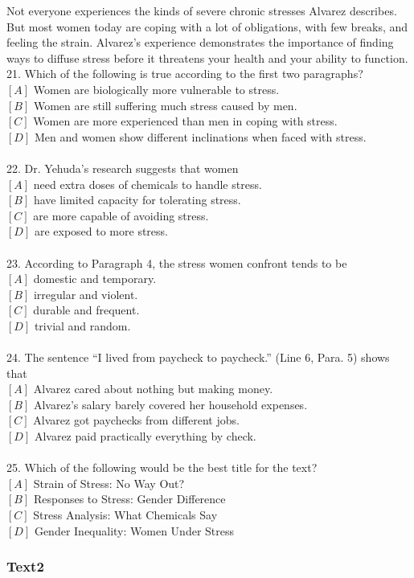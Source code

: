 \documentclass[a4paper]{article}
\begin{document}
\par
Not everyone experiences the kinds of severe chronic stresses Alvarez describes. But most women today are coping with a lot of obligations, with few breaks, and feeling the strain. Alvarez’s experience demonstrates the importance of finding ways to diffuse stress before it threatens your health and your ability to function.
\\21.	Which of the following is true according to the first two paragraphs?\\$[A]$ Women are biologically more vulnerable to stress.\\$[B]$ Women are still suffering much stress caused by men.\\$[C]$ Women are more experienced than men in coping with stress.\\$[D]$ Men and women show different inclinations when faced with stress.\\\\22.	Dr. Yehuda’s research suggests that women\\$[A]$ need extra doses of chemicals to handle stress.\\$[B]$ have limited capacity for tolerating stress.\\$[C]$ are more capable of avoiding stress.\\$[D]$ are exposed to more stress.\\\\23.	According to Paragraph 4, the stress women confront tends to be\\$[A]$ domestic and temporary.\\$[B]$ irregular and violent.\\$[C]$ durable and frequent.\\$[D]$ trivial and random.\\\\24.	The sentence “I lived from paycheck to paycheck.” (Line 6, Para. 5) shows that\\$[A]$ Alvarez cared about nothing but making money.\\$[B]$ Alvarez’s salary barely covered her household expenses.\\$[C]$ Alvarez got paychecks from different jobs.\\$[D]$ Alvarez paid practically everything by check.\\\\25.	Which of the following would be the best title for the text?\\$[A]$ Strain of Stress: No Way Out?\\$[B]$ Responses to Stress: Gender Difference\\$[C]$ Stress Analysis: What Chemicals Say\\$[D]$ Gender Inequality: Women Under Stress\\\subsubsection{Text2}
\end{document}
